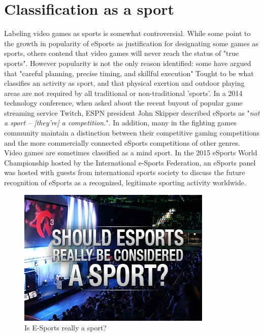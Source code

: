 \section{Classification as a sport}
		Labeling video games as sports is somewhat controversial. While some point to the growth in popularity of eSports as justification for designating some games as sports, others contend that video games will never reach the status of "true sports". However popularity is not the only reason identified: some have argued that "careful planning, precise timing, and skillful execution" Tought to be what classifies an activity as sport, and that physical exertion and outdoor playing areas are not required by all traditional or non-traditional 'sports'. In a 2014 technology conference, when asked about the recent buyout of popular game streaming service Twitch, ESPN president John Skipper described eSports as "\textit{not a sport – [they're] a competition.}". In addition, many in the fighting games community maintain a distinction between their competitive gaming competitions and the more commercially connected eSports competitions of other genres. Video games are sometimes classified as a mind sport. In the 2015 eSports World Championship hosted by the International e-Sports Federation, an eSports panel was hosted with guests from international sports society to discuss the future recognition of eSports as a recognized, legitimate sporting activity worldwide.
		
				\begin{figure}[!h]
					\begin{center}
						\includegraphics[width=0.68\linewidth]{images/is_esport_sport}
						\caption{Is E-Sports really a sport?}
					\end{center}
				\end{figure}
